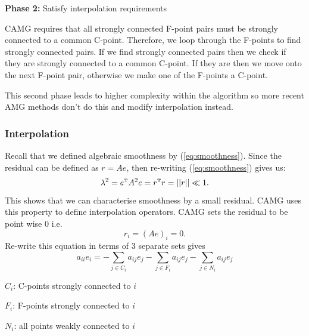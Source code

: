 \documentclass[11pt]{article}
\numberwithin{equation}{section}    %
\begin{document}
\textbf{Phase 2:} Satisfy interpolation requirements

CAMG requires that all strongly connected F-point pairs must be strongly connected to a common C-point. Therefore, we loop through the F-points to find strongly connected pairs. If we find strongly connected pairs then we check if they are strongly connected to a common C-point. If they are then we move onto the next F-point pair, otherwise we make one of the F-points a C-point.

This second phase leads to higher complexity within the algorithm so more recent AMG methods don't do this and modify interpolation instead.


\subsubsection*{Interpolation}

Recall that we defined algebraic smoothness by (\ref{eq:smoothness}). Since the residual can be defined as $r = Ae$, then re-writing (\ref{eq:smoothness}) gives us:
$$\lambda^2 = e^{\mbox{\tiny T}} A^2e = r^{\mbox{\tiny T}}r = ||r|| \ll1.$$
This shows that we can characterise smoothness by a small residual. CAMG uses this property to define interpolation operators. CAMG sets the residual to be point wise $0$ i.e.
$$r_i = (Ae)_i = 0.$$
Re-write this equation in terms of $3$ separate sets gives
\begin{equation}\label{eq:3separate}
    a_{ii}e_i = -\sum_{j\in C_i} a_{ij}e_j -\sum_{j\in F_i} a_{ij} e_j -\sum_{j\in N_i} a_{ij}e_j
\end{equation}

\hspace{.25in}$C_i$: C-points strongly connected to $ i$

\hspace{.25in}$F_i$: F-points strongly connected to $i$

\hspace{.25in}$N_i$: all points weakly connected to $i$
\end{document}
